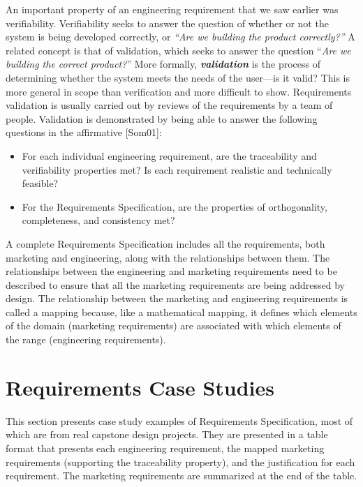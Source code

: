 An important property of an engineering requirement that we saw earlier
was verifiability. Verifiability seeks to answer the question of whether
or not the system is being developed correctly, or \emph{``Are we
building the product correctly?''} A related concept is that of
validation, which seeks to answer the question ``\emph{Are we building
the correct product?}'' More formally, \emph{\textbf{validation}} is the
process of determining whether the system meets the needs of the
user---is it valid? This is more general in scope than verification and
more difficult to show. Requirements validation is usually carried out
by reviews of the requirements by a team of people. Validation is
demonstrated by being able to answer the following questions in the
affirmative {[}Som01{]}:

\begin{itemize}
\item
  For each individual engineering requirement, are the traceability and
  verifiability properties met? Is each requirement realistic and
  technically feasible?
\item
  For the Requirements Specification, are the properties of
  orthogonality, completeness, and consistency met?
\end{itemize}

  A complete Requirements Specification includes all the requirements,
  both marketing and engineering, along with the relationships between
  them. The relationships between the engineering and marketing
  requirements need to be described to ensure that all the marketing
  requirements are being addressed by design. The relationship between
  the marketing and engineering requirements is called a mapping
  because, like a mathematical mapping, it defines which elements of the
  domain (marketing requirements) are associated with which elements of
  the range (engineering requirements).


\section{Requirements Case Studies}
\label{section:requirements-case-studies}

This section presents case study examples of Requirements Specification,
most of which are from real capstone design projects. They are presented
in a table format that presents each engineering requirement, the mapped
marketing requirements (supporting the traceability property), and the
justification for each requirement. The marketing requirements are
summarized at the end of the table.

